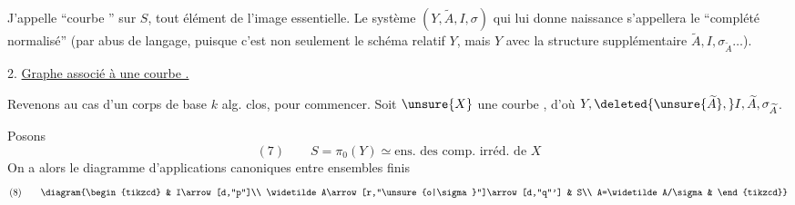 J'appelle ``courbe  '' sur $S$, tout élément de l'image essentielle. Le système $(Y,\widetilde A,I,\sigma)$ qui lui donne naissance s'appellera le ``complété normalisé''  (par abus de  langage, puisque c'est non seulement le schéma relatif $Y$, mais $Y$ avec la structure supplémentaire $\widetilde A,I,\sigma_{\widetilde A}\ldots$).

2. \uline{Graphe associé à une courbe .}

Revenons au cas d'un corps de base $k$ alg. clos, pour commencer. Soit $\unsure{X}$ une courbe , d'où $Y,\deleted{\unsure{\widetilde A},}I,\widetilde A,\sigma_{\widetilde A}$.

Posons
\[
(7)\qquad S=\pi_0(Y)\simeq\text{ens. des comp. irréd. de }X
\]
On a alors le diagramme d'applications canoniques entre ensembles finis
\[
(8)\qquad
\diagram{\begin{tikzcd}
& I\arrow[d,"p"]\\
\widetilde A\arrow[r,"\unsure{o|\sigma}"]\arrow[d,"q"'] & S\\
A=\widetilde A/\sigma &
\end{tikzcd}}
\]
